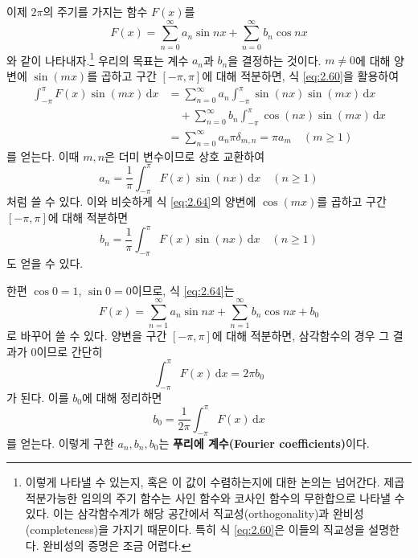 \documentclass[chapter, oneside, b5paper]{oblivoir}
\theoremstyle{plain}
\theoremstyle{definition}
\theoremstyle{remark}
\begin{document}
이제 $2\pi$의 주기를 가지는 함수 $F(x)$를
\begin{equation}
    F(x) = \sum_{n=0}^{\infty}{a_n\sin{nx}}+\sum_{n=0}^{\infty}{b_n\cos{nx}} \label{eq:2.64}
\end{equation}
와 같이 나타내자.\footnote{이렇게 나타낼 수 있는지, 혹은 이 값이 수렴하는지에 대한 논의는 넘어간다. 제곱적분가능한 임의의 주기 함수는 사인 함수와 코사인 함수의 무한합으로 나타낼 수 있다. 이는 삼각함수계가 해당 공간에서 직교성(orthogonality)과 완비성(completeness)을 가지기 때문이다. 특히 식 \ref{eq:2.60}은 이들의 직교성을 설명한다. 완비성의 증명은 조금 어렵다.} 우리의 목표는 계수 $a_n$과 $b_n$을 결정하는 것이다. $m \neq 0$에 대해 양변에 $\sin{(mx)}$를 곱하고 구간 $[-\pi, \pi]$에 대해 적분하면, 식 \ref{eq:2.60}을 활용하여
\begin{equation}
\begin{split}
    \int_{-\pi}^{\pi} F(x)\sin(mx)\,\mathrm{d}x
    &= \sum_{n=0}^{\infty} a_n
       \int_{-\pi}^{\pi}\sin(nx)\sin(mx)\,\mathrm{d}x \\
    &\quad + \sum_{n=0}^{\infty} b_n
       \int_{-\pi}^{\pi}\cos(nx)\sin(mx)\,\mathrm{d}x \\
    &= \sum_{n=0}^{\infty} a_n \pi \delta_{m,n} = \pi a_m \quad (m \ge 1)
\end{split}
\label{eq:2.65}
\end{equation}
를 얻는다. 이때 $m, n$은 더미 변수이므로 상호 교환하여
\begin{equation}
    a_n = \frac{1}{\pi} \int_{-\pi}^{\pi} F(x)\sin(nx)\,\mathrm{d}x \quad (n \ge 1) \label{eq:2.66}
\end{equation}처럼 쓸 수 있다. 이와 비슷하게 식 \ref{eq:2.64}의 양변에 $\cos{(mx)}$를 곱하고 구간 $[-\pi, \pi]$에 대해 적분하면
\begin{equation}
    b_n = \frac{1}{\pi} \int_{-\pi}^{\pi} F(x)\sin(nx)\,\mathrm{d}x \quad (n \ge 1) \label{eq:2.67}
\end{equation}도 얻을 수 있다.

한편 $\cos{0}=1$, $\sin{0}=0$이므로, 식 \ref{eq:2.64}는
\begin{equation}
    F(x) = \sum_{n=1}^{\infty}{a_n\sin{nx}}+\sum_{n=1}^{\infty}{b_n\cos{nx}}+b_0 \label{eq:2.68}
\end{equation}
로 바꾸어 쓸 수 있다. 양변을 구간 $[-\pi, \pi]$에 대해 적분하면, 삼각함수의 경우 그 결과가 0이므로 간단히
\begin{equation}
    \int_{-\pi}^{\pi}F(x) \,\mathrm{d}x = 2\pi b_0 \label{eq:2.69}
\end{equation}
가 된다. 이를 $b_0$에 대해 정리하면
\begin{equation}
    b_0 = \frac{1}{2\pi} \int_{-\pi}^{\pi}F(x) \,\mathrm{d}x \label{eq:2.70}
\end{equation}
를 얻는다. 이렇게 구한 $a_n, b_n, b_0$는 \textbf{푸리에 계수(Fourier coefficients)}이다.
\end{document}
